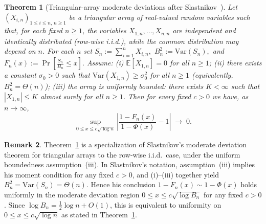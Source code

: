 \documentclass{article}
\theoremstyle{plain}
\newtheorem{theorem}{Theorem}[section]
\theoremstyle{definition}
\newtheorem{remark}[theorem]{Remark}
\begin{document}
\begin{theorem}[Triangular-array moderate deviations after Slastnikov~\cite{slastnikovLimitTheoremsModerate1979}]
\label{thm:slastnikov-triangular}
Let $(X_{i,n})_{1\le i\le n,\,n\ge1}$ be a triangular array of
real-valued random variables such that, for each fixed $n\ge1$,
the variables $X_{1,n},\dots,X_{n,n}$ are independent and identically
distributed (row-wise i.i.d.), while the common distribution may depend
on $n$. For each $n$ set
$
  S_n := \sum_{i=1}^n X_{i,n},
$
$
  B_n^2 := \mathrm{Var}(S_n),
$ and
$
  F_n(x) := \Pr\!\left[\frac{S_n}{B_n}\le x\right].
$
Assume:
  (i) $\mathbb{E}[X_{1,n}] = 0$ for all $n\ge1$;
  (ii) there exists a constant $\sigma_0>0$ such that
  $\mathrm{Var}(X_{1,n}) \ge \sigma_0^2$ for all $n\ge1$ (equivalently, $B_n^2= \Theta(n)$);
  (iii) the array is uniformly bounded: there exists $K<\infty$ such that
  $|X_{1,n}|\le K$ almost surely for all $n\ge1$.
Then for every fixed $c>0$ we have, as $n\to\infty$,
\[
  \sup_{0\le x\le c\sqrt{\log n}}
  \left|
    \frac{1-F_n(x)}{1-\Phi(x)} - 1
  \right|
  \;\longrightarrow\; 0.
\]
\end{theorem}

\begin{remark}
Theorem~\ref{thm:slastnikov-triangular} is a specialization of
Slastnikov's moderate deviation theorem for triangular arrays
\cite[Thm.~1.1]{slastnikovLimitTheoremsModerate1979}
to the row-wise i.i.d.\ case, under the uniform boundedness
assumption~(iii).
In Slastnikov's notation, assumption~(iii) implies his moment condition for any fixed $c>0$, and (i)–(iii) together yield
$B_n^2 = \mathrm{Var}(S_n) = \Theta(n)$.
Hence his conclusion
$
  1-F_n(x) \sim 1-\Phi(x)
$
holds uniformly in the moderate deviation region
$0 \le x \le c\sqrt{\log B_n}$ for any fixed $c>0$.
Since $\log B_n = \tfrac12 \log n + O(1)$, this is equivalent to
uniformity on $0 \le x \le c\sqrt{\log n}$ as stated in
Theorem~\ref{thm:slastnikov-triangular}.
\end{remark}
\end{document}
